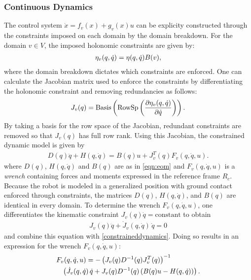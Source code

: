 \subsubsection{Continuous Dynamics}
The control system $\dot{x} = f_v(x) + g_v(x)u$ can be explicity constructed through the constraints imposed on each domain by the domain breakdown. For the domain $v \in V$, the imposed holonomic constraints are given by:
\begin{align}
  \eta_{v}(q, {\dot q}) = \eta(q, {\dot q})B(v),
\end{align}
where the domain breakdown dictates which constraints are enforced. One can calculate the Jacobian matrix used to enforce the constraints by differentiating the holonomic constraint and removing redundancies as follows:
\begin{align}
  J_{v}(q) = \mathrm{Basis}\left( \mathrm{RowSp}\left( \frac{\partial{\eta_{v}(q, {\dot q})}}{\partial{{\dot q}}} \right) \right).
\end{align}
By taking a basis for the row space of the Jacobian, redundant constraints are removed so that $J_v(q)$ has full row rank. Using this Jacobian, the constrained dynamic model is given by
\begin{align}
  \label{constraineddynamics}
  D(q){\ddot q} + H(q,{\dot q}) = B(q) u + J_v^T(q) F_v(q, {\dot q}, u).
\end{align}
where $D(q)$, $H(q, {\dot q})$ and $B(q)$ are as in \eqref{eqn:eom} and $F_v(q, {\dot q}, u)$ is a {\em wrench} containing forces and moments expressed in the reference frame $R_c$.\cite{MLS94}\xspace Because the robot is modeled in a generalized position with ground contact enforced through constraints, the matrices $D(q)$, $H(q, {\dot q})$, and $B(q)$ are identical in every domain. To determine the wrench $F_v(q, {\dot q}, u)$, one differentiates the kinematic constraint $J_v(q) {\dot q} = \mathrm{constant}$ to obtain
\begin{align}
  J_{v}(q) {\ddot q} + {\dot J}_{v}(q, {\dot q}) \, {\dot q} = 0
\end{align}
and combine this equation with \eqref{constraineddynamics}. Doing so results in an expression for the wrench $F_v(q, {\dot q}, u)$:
\begin{align}
  \label{eq:wrench}
  \lefteqn{F_{v}(q, {\dot q}, u) = -\left( J_{v}(q) D^{-1}(q) J_{v}^{T}(q) \right)^{-1} }\\
  \nonumber
  &&\left( {\dot J}_{v}(q, {\dot q}) \, {\dot q} + J_{v}(q) D^{-1}(q) \left( B(q) u - H(q, {\dot q}) \right) \right).
\end{align}
